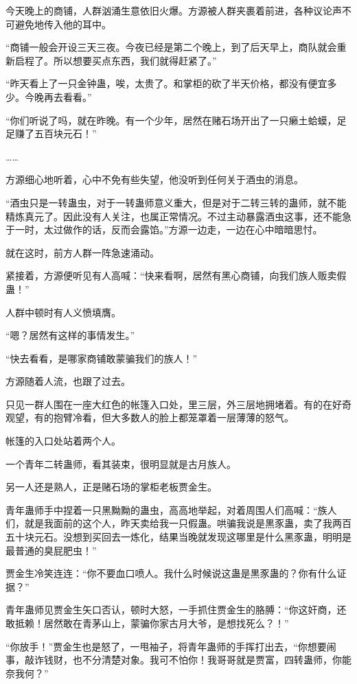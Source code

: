 \begin{this_body}
今天晚上的商铺，人群汹涌生意依旧火爆。方源被人群夹裹着前进，各种议论声不可避免地传入他的耳中。

“商铺一般会开设三天三夜。今夜已经是第二个晚上，到了后天早上，商队就会重新启程了。所以想要买点东西，我们就得赶紧了。”

“昨天看上了一只金钟蛊，唉，太贵了。和掌柜的砍了半天价格，都没有便宜多少。今晚再去看看。”

“你们听说了吗，就在昨晚。有一个少年，居然在赌石场开出了一只癞土蛤蟆，足足赚了五百块元石！”

……

方源细心地听着，心中不免有些失望，他没听到任何关于酒虫的消息。

“酒虫只是一转蛊虫，对于一转蛊师意义重大，但是对于二转三转的蛊师，就不能精炼真元了。因此没有人关注，也属正常情况。不过主动暴露酒虫这事，还不能急于一时，太过做作的话，反而会露馅。”方源一边走，一边在心中暗暗思忖。

就在这时，前方人群一阵急速涌动。

紧接着，方源便听见有人高喊：“快来看啊，居然有黑心商铺，向我们族人贩卖假蛊！”

人群中顿时有人义愤填膺。

“嗯？居然有这样的事情发生。”

“快去看看，是哪家商铺敢蒙骗我们的族人！”

方源随着人流，也跟了过去。

只见一群人围在一座大红色的帐篷入口处，里三层，外三层地拥堵着。有的在好奇观望，有的抱臂冷看，但大多数人的脸上都笼罩着一层薄薄的怒气。

帐篷的入口处站着两个人。

一个青年二转蛊师，看其装束，很明显就是古月族人。

另一人还是熟人，正是赌石场的掌柜老板贾金生。

青年蛊师手中捏着一只黑黝黝的蛊虫，高高地举起，对着周围人们高喊：“族人们，就是我面前的这个人，昨天卖给我一只假蛊。哄骗我说是黒豕蛊，卖了我两百五十块元石。没想到买回去一炼化，结果当晚就发现这哪里是什么黑豕蛊，明明是最普通的臭屁肥虫！”

贾金生冷笑连连：“你不要血口喷人。我什么时候说这蛊是黒豕蛊的？你有什么证据？”

青年蛊师见贾金生矢口否认，顿时大怒，一手抓住贾金生的胳膊：“你这奸商，还敢抵赖！居然敢在青茅山上，蒙骗你家古月大爷，是想找死么？！”

“你放手！”贾金生也是怒了，一甩袖子，将青年蛊师的手挥打出去，“你想要闹事，敲诈钱财，也不分清楚对象。我可不怕你！我哥哥就是贾富，四转蛊师，你能奈我何？”


\end{this_body}
